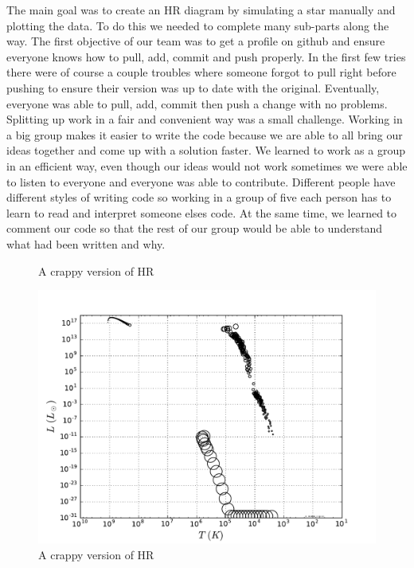 \documentclass[10pt]{article}
\begin{document}
The main goal was to create an HR diagram by simulating a star manually and plotting the data. To do this we needed to complete many sub-parts along the way. The first objective of our team was to get a profile on github and ensure everyone knows how to pull, add, commit and push properly. In the first few tries there were of course a couple troubles where someone forgot to pull right before pushing to ensure their version was up to date with the original. Eventually, everyone was able to pull, add, commit then push a change with no problems. Splitting up work in a fair and convenient way was a small challenge. Working in a big group makes it easier to write the code because we are able to all bring our ideas together and come up with a solution faster. We learned to work as a group in an efficient way, even though our ideas would not work sometimes we were able to listen to everyone and everyone was able to contribute. Different people have different styles of writing code so working in a group of five each person has to learn to read and interpret someone elses code. At the same time, we learned to comment our code so that the rest of our group would be able to understand what had been written and why.\\


\begin{figure}[p]
\begin{centering}

\caption{A crappy version of HR}
\label{fig:badHR}
\end{centering}
\end{figure}

\begin{figure}[p]
\begin{centering}
\includegraphics[width=\textwidth]{new_bad_hr.pdf}
\caption{A crappy version of HR}
\label{fig:nosobadHR}
\end{centering}
\end{figure}
\end{document}
